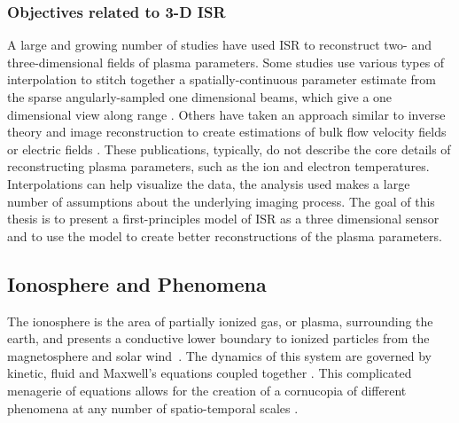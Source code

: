 \subsubsection{Objectives related to 3-D ISR}
A large and growing number of studies have used ISR to reconstruct two- and three-dimensional fields of plasma parameters. Some studies use various types of interpolation to stitch together a spatially-continuous parameter estimate from the sparse angularly-sampled one dimensional beams, which give a one dimensional view along range \citep{Semeter2009738,Butler:2013ul,Semeter:2005fo}. Others have taken an approach similar to inverse theory and image reconstruction to create estimations of  bulk flow velocity fields or electric fields \citep{butler:imagingfregiondrifts,RDS:RDS20195}. These publications, typically, do not describe the core details of reconstructing plasma parameters, such as the ion and electron temperatures. Interpolations can help visualize the data, the analysis used makes a large number of assumptions about the underlying imaging process. The goal of this thesis is to present a first-principles model of ISR as a three dimensional sensor and to use the model to create better reconstructions of the plasma parameters.
%
%

\subsection{Ionosphere and Phenomena}
The ionosphere is the area of partially ionized gas, or plasma, surrounding the earth, and presents a conductive lower boundary to ionized particles from the magnetosphere and solar wind~\citep{kellybook}. The dynamics of this system are governed by kinetic, fluid and Maxwell's equations coupled together \citep{schunk2004ionospheres}. This complicated menagerie of equations allows for the creation of a cornucopia of different phenomena at any number of spatio-temporal scales \citep{Semeter:2008hs,Semeter2009738}.


